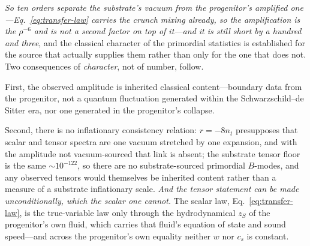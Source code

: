 \documentclass[11pt,a4paper]{article}
\theoremstyle{plain}
\theoremstyle{definition}
\theoremstyle{remark}
\begin{document}
\emph{So ten orders separate the substrate's vacuum from the progenitor's amplified one---Eq.~\eqref{eq:transfer-law} carries the crunch mixing already, so the amplification is the $\rho^{-6}$ and is not a second factor on top of it---and it is still short by a hundred and three}, and the classical character of the primordial statistics is established for the source that actually supplies them rather than only for the one that does not. Two consequences of \emph{character}, not of number, follow. 

First, the observed amplitude is inherited classical content---boundary data from the progenitor, not a quantum fluctuation generated within the Schwarzschild--de Sitter era, nor one generated in the progenitor's collapse. 

Second, there is no inflationary consistency relation: $r=-8n_t$ presupposes that scalar and tensor spectra are one vacuum stretched by one expansion, and with the amplitude not vacuum-sourced that link is absent; the substrate tensor floor is the same $\sim10^{-122}$, so there are no substrate-sourced primordial $B$-modes, and any observed tensors would themselves be inherited content rather than a measure of a substrate inflationary scale. \emph{And the tensor statement can be made unconditionally, which the scalar one cannot.} The scalar law, Eq.~\eqref{eq:transfer-law}, is the true-variable law only through the hydrodynamical $z_S$ of the progenitor's own fluid, which carries that fluid's equation of state and sound speed---and across the progenitor's own equality neither $w$ nor $c_s$ is constant. 
\end{document}
